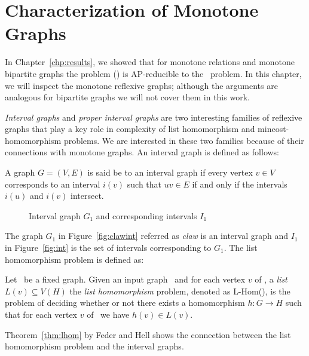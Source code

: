 \chapter{Characterization of Monotone Graphs}
In Chapter~\ref{chp:results}, we showed that for monotone relations and monotone
bipartite graphs the problem \ccsp(\mH) is AP-reducible to the \cbis\ problem. In this chapter,
we will inspect the monotone reflexive graphs; although the arguments are
analogous for bipartite graphs we will not cover them in this work.

\emph{Interval graphs} and \emph{proper interval graphs}
are two interesting families of reflexive graphs that play a key role in complexity of 
list homomorphism and mincost-homomorphism problems. We are interested in these two families
because of their connections with monotone graphs. An interval graph is defined as follows:

\begin{defi}
A graph \(G=(V,E)\) is said be to an interval graph if every vertex \(v \in V\)
corresponds to an interval \(i(v)\) such that \(uv \in E\) if and only if the intervals
\(i(u)\) and \(i(v)\) intersect.
\end{defi}

\begin{figure} [h]
\hfill
\subfigure[\ensuremath{G_1}]{\label{fig:clawint}}\hfill 
\subfigure[\ensuremath{I_1}]{\label{fig:int}}\hfill 
\caption{Interval graph \ensuremath{G_1} and corresponding intervals \ensuremath{I_1}}
\end{figure}

The graph \(G_1\) in Figure~\ref{fig:clawint} referred as \emph{claw} is an interval graph
and \(I_1\) in Figure~\ref{fig:int} is the set of intervals corresponding to \(G_1\)\@.
The list homomorphism problem is defined as:

\begin{defi} [L-Hom]
Let \mH\ be a fixed graph. Given an input graph \mG\ and for each vertex \(v\) of \mG,
a \emph{list} \(L(v) \subseteq V(H)\) the \emph{list homomorphism} problem, denoted
as L-Hom(\mH), is the problem of  deciding whether or not
there exists a homomorphism \(h: G\to H\) such that for each vertex \(v\) of \mG\ 
we have \(h(v)\in L(v)\)\@.
\end{defi}

Theorem~\ref{thm:lhom} by Feder and Hell shows the connection between the list homomorphism
problem and the interval graphs.

